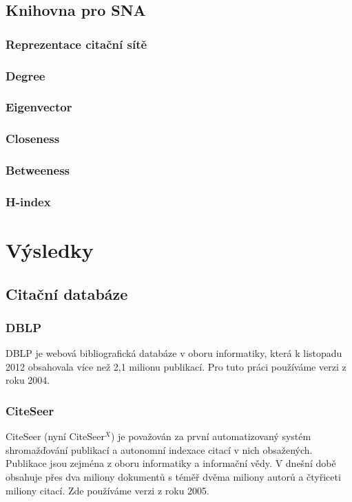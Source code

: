 \documentclass[12pt,titlepage]{report}
\begin{document}
\section{Knihovna pro SNA}

\subsection{Reprezentace citační sítě}
\subsection{Degree}
\subsection{Eigenvector}
\subsection{Closeness}
\subsection{Betweeness}
\subsection{H-index}

\chapter{Výsledky}
\section{Citační databáze}
\subsection{DBLP}
DBLP \cite{DBLP} je webová bibliografická databáze v oboru informatiky,
která k listopadu 2012 obsahovala více než 2,1 milionu publikací. Pro tuto
práci používáme verzi z roku 2004.

\subsection{CiteSeer}
CiteSeer (nyní CiteSeer$^X$) \cite{citeseer} je považován za první
automatizovaný systém shromažďování publikací a autonomní indexace citací v
nich obsažených. Publikace jsou zejména z oboru informatiky a informační vědy.
V dnešní době obsahuje přes dva miliony dokumentů s téměř dvěma miliony autorů
a čtyřiceti miliony citací. Zde používáme verzi z roku 2005.
\end{document}
